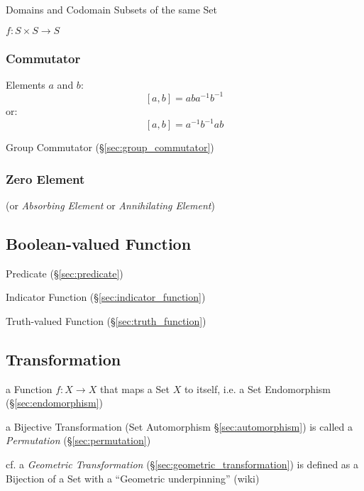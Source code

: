 Domains and Codomain Subsets of the same Set

$f : S \times S \to S$



\subsubsection{Commutator}\label{sec:commutator}

Elements $a$ and $b$:
\[
  [a,b] = aba^{-1}b^{-1}
\]
or:
\[
  [a,b] = a^{-1}b^{-1}ab
\]

Group Commutator (\S\ref{sec:group_commutator})



\subsubsection{Zero Element}\label{sec:zero_element}

(or \emph{Absorbing Element} or \emph{Annihilating Element})



\subsection{Boolean-valued Function}\label{sec:boolean_function}

Predicate (\S\ref{sec:predicate})

Indicator Function (\S\ref{sec:indicator_function})

Truth-valued Function (\S\ref{sec:truth_function})



\subsection{Transformation}\label{sec:transformation}

a Function $f : X \to X$ that maps a Set $X$ to itself, i.e. a Set
Endomorphism (\S\ref{sec:endomorphism})

a Bijective Transformation (Set Automorphism \S\ref{sec:automorphism}) is called
a \emph{Permutation} (\S\ref{sec:permutation})

cf. a \emph{Geometric Transformation} (\S\ref{sec:geometric_transformation}) is
defined as a Bijection of a Set with a ``Geometric underpinning'' (wiki)

